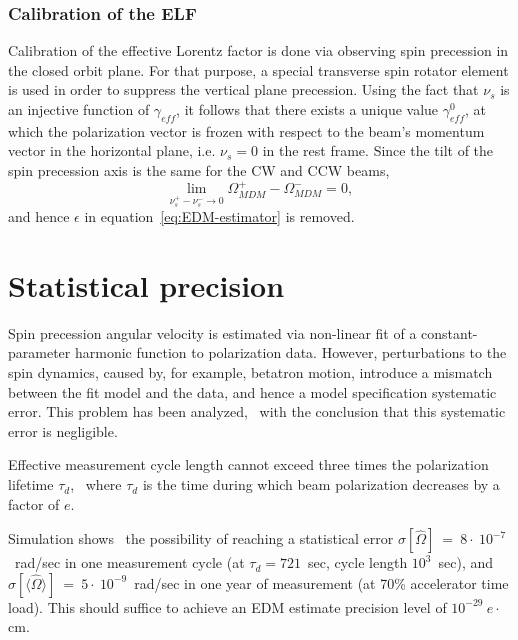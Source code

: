 \documentclass[12pt]{article}
\newcommand{\avg}[1]{\langle{#1}\rangle}
\newcommand{\W}{\Omega}
\newcommand{\geff}{\gamma_{eff}}
\begin{document}
\subsubsection{Calibration of the ELF}
Calibration of the effective Lorentz factor is done via observing spin precession in the closed orbit plane. For that purpose, a special transverse spin rotator element is used in order to suppress the vertical plane precession.  Using the fact that $\nu_s$ is an injective function of $\geff$, it follows that there exists a unique value $\geff^0$, at which the polarization vector is frozen with respect to the beam's momentum vector in the horizontal plane, i.e. $\nu_s=0$ in the rest frame. Since the tilt of the spin precession axis is the same for the CW and CCW beams,  
\[
\lim_{\nu_s^+ - \nu_s^- \to 0} \W_{MDM}^+ - \W_{MDM}^- = 0,
\]
and hence $\epsilon$ in equation~\eqref{eq:EDM-estimator} is removed.

\section{Statistical precision}
Spin precession angular velocity is estimated via non-linear fit of a constant-parameter harmonic function to polarization data. However, perturbations to the spin dynamics, caused by, for example, betatron motion, introduce a mismatch between the fit model and the data, and hence a model specification systematic error. This problem has been analyzed,~\cite{Aksentev:IPAC19:SMP} with the conclusion that this systematic error is negligible.

Effective measurement cycle length cannot exceed three times the polarization lifetime $\tau_d$,~\cite{Stats} where $\tau_d$ is the time during which beam polarization decreases by a factor of $e$.

Simulation shows~\cite{Stats} the possibility of reaching a statistical error $\sigma[\hat\W]~=~8\cdot~10^{-7}$~rad/sec in one measurement cycle (at $\tau_d = 721$~sec, cycle length $10^3$~sec), and $\sigma[\avg{\hat\W}]~=~5\cdot~10^{-9}$~rad/sec in one year of measurement (at 70\% accelerator time load). This should suffice to achieve an EDM estimate precision level of $10^{-29}~e\cdot$cm.
\end{document}
